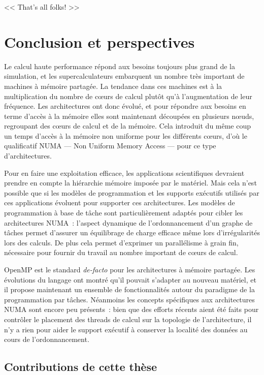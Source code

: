 \begin{savequote}[6cm]
<< That's all folks! >>
\end{savequote}

\chapter{Conclusion et perspectives}\label{chap:conclusion}
\chaptertoc

Le calcul haute performance répond aux besoins toujours plus grand de la simulation, et les supercalculateurs embarquent un nombre très important de machines à mémoire partagée.
La tendance dans ces machines est à la multiplication du nombre de cœurs de calcul plutôt qu'à l'augmentation de leur fréquence.
Les architectures ont donc évolué, et pour répondre aux besoins en terme d'accès à la mémoire elles sont maintenant découpées en plusieurs nœuds, regroupant des cœurs de calcul et de la mémoire.
Cela introduit du même coup un temps d'accès à la mémoire non uniforme pour les différents cœurs, d'où le qualificatif NUMA --- Non Uniform Memory Access --- pour ce type d'architectures.

Pour en faire une exploitation efficace, les applications scientifiques devraient prendre en compte la hiérarchie mémoire imposée par le matériel.
Mais cela n'est possible que si les modèles de programmation et les supports exécutifs utilisés par ces applications évoluent pour supporter ces architectures.
Les modèles de programmation à base de tâche sont particulièrement adaptés pour cibler les architectures NUMA~: l'aspect dynamique de l'ordonnancement d'un graphe de tâches permet d'assurer un équilibrage de charge efficace même lors d'irrégularités lors des calculs.
De plus cela permet d'exprimer un parallélisme à grain fin, nécessaire pour fournir du travail au nombre important de cœurs de calcul.

OpenMP est le standard \emph{de-facto} pour les architectures à mémoire partagée.
Les évolutions du langage ont montré qu'il pouvait s'adapter au nouveau matériel, et il propose maintenant un ensemble de fonctionnalités autour du paradigme de la programmation par tâches.
Néanmoins les concepts spécifiques aux architectures NUMA sont encore peu présents~: bien que des efforts récents aient été faits pour contrôler le placement des threads de calcul sur la topologie de l'architecture, il n'y a rien pour aider le support exécutif à conserver la localité des données au cours de l'ordonnancement.

\section*{Contributions de cette thèse}

